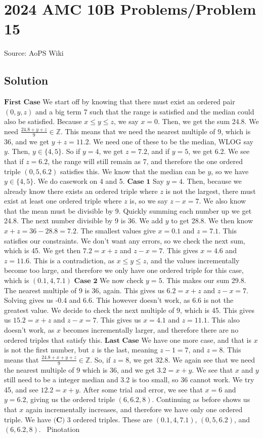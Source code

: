 \documentclass[12pt]{article}
\begin{document}
\section*{{2024 AMC 10B Problems/Problem 15}}
Source: AoPS Wiki

\subsection*{Solution}
$\textbf{First Case}$ We start off by knowing that there must exist an ordered pair \( (0,y,z) \) and a big term 7 such that the range is satisfied and the median could also be satisfied. Because \( x \le y \le z \), we say \( x=0 \). Then, we get the sum 24.8. We need \( \frac{24.8 +y +z}{9} \in \mathbb{Z} \). This means that we need the nearest multiple of 9, which is 36, and we get \( y+z = 11.2 \). We need one of these to be the median, WLOG say \( y \). Then, \( y \in \{4,5\} \). So if \( y=4 \), we get \( z=7.2 \), and if \( y=5 \), we get 6.2. We see that if \( z=6.2 \), the range will still remain as 7, and therefore the one ordered triple \( (0,5,6.2) \) satisfies this. We know that the median can be \( y \), so we have \( y \in \{4,5\} \). We do casework on 4 and 5. $\textbf{Case 1}$ Say \( y=4 \). Then, because we already know there exists an ordered triple where \( z \) is not the largest, there must exist at least one ordered triple where \( z \) is, so we say \( z-x=7 \). We also know that the mean must be divisible by 9. Quickly summing each number up we get 24.8. The next number divisible by 9 is 36. We add \( y \) to get 28.8. We then know \( x+z=36-28.8=7.2 \). The smallest values give \( x=0.1 \) and \( z=7.1 \). This satisfies our constraints. We don't want any errors, so we check the next sum, which is 45. We get then \( 7.2=x+z \) and \( z-x=7 \). This gives \( x=4.6 \) and \( z=11.6 \). This is a contradiction, as \( x \le y \le z \), and the values incrementally become too large, and therefore we only have one ordered triple for this case, which is \( (0.1,4,7.1) \) $\textbf{Case 2}$ We now check \( y=5 \). This makes our sum 29.8. The nearest multiple of 9 is 36, again. This gives us \( 6.2 = x+z \) and \( z-x=7 \). Solving gives us -0.4 and 6.6. This however doesn't work, as 6.6 is not the greatest value. We decide to check the next multiple of 9, which is 45. This gives us \( 15.2 = x+z \) and \( z-x=7 \). This gives us \( x=4.1 \) and \( z=11.1 \). This also doesn't work, as \( x \) becomes incrementally larger, and therefore there are no ordered triples that satisfy this. $\textbf{Last Case}$ We have one more case, and that is \(x\) is not the first number, but \( z \) is the last, meaning \( z-1=7 \), and \( z=8 \). This means that \( \frac{24.8+x+y+z}{9} \in \mathbb{Z} \). So, if \( z=8 \), we get 32.8. We again see that we need the nearest multiple of 9 which is 36, and we get \( 3.2 = x+y \). We see that \( x \) and \( y \) still need to be a integer median and 3.2 is too small, so 36 cannot work. We try 45, and see \( 12.2 = x+y \). After some trial and error, we see that \( x=6 \) and \( y=6.2 \), giving us the ordered triple \( (6,6.2,8) \). Continuing as before shows us that \( x \) again incrementally increases, and therefore we have only one ordered triple. We have $\boxed{\textbf{(C) }3}$ ordered triples. These are \( (0.1,4,7.1) \), \( (0,5,6.2) \), and \( (6,6.2,8) \). ~Pinotation
\end{document}

